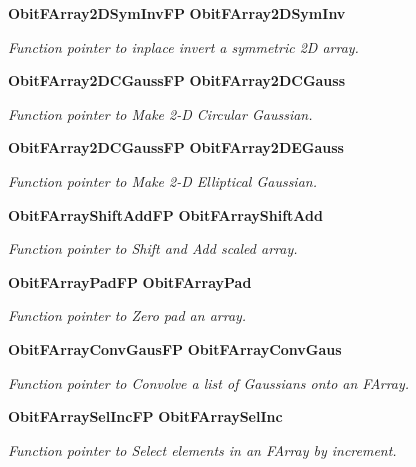 \begin{CompactItemize}
{\bf Obit\-FArray2DSym\-Inv\-FP} {\bf Obit\-FArray2DSym\-Inv}
\begin{CompactList}\small\item\em Function pointer to inplace invert a symmetric 2D array. \item\end{CompactList}\item 
{\bf Obit\-FArray2DCGauss\-FP} {\bf Obit\-FArray2DCGauss}
\begin{CompactList}\small\item\em Function pointer to Make 2-D Circular Gaussian. \item\end{CompactList}\item 
{\bf Obit\-FArray2DCGauss\-FP} {\bf Obit\-FArray2DEGauss}
\begin{CompactList}\small\item\em Function pointer to Make 2-D Elliptical Gaussian. \item\end{CompactList}\item 
{\bf Obit\-FArray\-Shift\-Add\-FP} {\bf Obit\-FArray\-Shift\-Add}
\begin{CompactList}\small\item\em Function pointer to Shift and Add scaled array. \item\end{CompactList}\item 
{\bf Obit\-FArray\-Pad\-FP} {\bf Obit\-FArray\-Pad}
\begin{CompactList}\small\item\em Function pointer to Zero pad an array. \item\end{CompactList}\item 
{\bf Obit\-FArray\-Conv\-Gaus\-FP} {\bf Obit\-FArray\-Conv\-Gaus}
\begin{CompactList}\small\item\em Function pointer to Convolve a list of Gaussians onto an FArray. \item\end{CompactList}\item 
{\bf Obit\-FArray\-Sel\-Inc\-FP} {\bf Obit\-FArray\-Sel\-Inc}
\begin{CompactList}\small\item\em Function pointer to Select elements in an FArray by increment. \item\end{CompactList}\end{CompactItemize}


